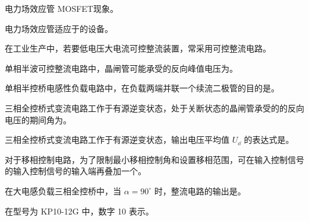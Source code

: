 \documentclass[电力电子]{subfiles}
\begin{document}
\begin{ti}
	电力场效应管 MOSFET现象。
\end{ti}

\begin{ti}
	电力场效应管适应于的设备。
\end{ti}

\begin{ti}
	在工业生产中，若要低电压大电流可控整流装置，常采用可控整流电路。
\end{ti}

\begin{ti}
	单相半波可控整流电路中，晶闸管可能承受的反向峰值电压为。
\end{ti}

\begin{ti}
	单相半控桥电感性负载电路中，在负载两端并联一个续流二极管的目的是。
\end{ti}

\begin{ti}
	三相全控桥式变流电路工作于有源逆变状态，处于关断状态的晶闸管承受的的反向电压的期间角为。
\end{ti}

\begin{ti}
	三相全控桥式变流电路工作于有源逆变状态，输出电压平均值 $U_{\dd}$ 的表达式是。
\end{ti}

\begin{ti}
	对于移相控制电路，为了限制最小移相控制角和设置移相范围，可在输入控制信号的输入控制信号的输入端再叠加一个。
\end{ti}

\begin{ti}
	在大电感负载三相全控桥中，当 $\alpha = 90^\circ$ 时，整流电路的输出是。
\end{ti}

\begin{ti}
	在型号为 KP10-12G 中，数字 10 表示。
\end{ti}
\end{document}

